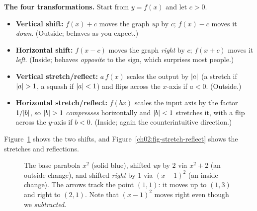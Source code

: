 \begin{focusbox}
\textbf{The four transformations.}\quad
Start from $y = f(x)$ and let $c > 0$.
\begin{itemize}
  \item \textbf{Vertical shift:} $f(x) + c$ moves the graph \emph{up} by $c$;
        $f(x) - c$ moves it \emph{down}. (Outside; behaves as you expect.)
  \item \textbf{Horizontal shift:} $f(x - c)$ moves the graph \emph{right} by $c$;
        $f(x + c)$ moves it \emph{left}. (Inside; behaves \emph{opposite} to the
        sign, which surprises most people.)
  \item \textbf{Vertical stretch/reflect:} $a\,f(x)$ scales the output by $\lvert a\rvert$
        (a stretch if $\lvert a\rvert>1$, a squash if $\lvert a\rvert<1$) and flips across the
        $x$-axis if $a < 0$. (Outside.)
  \item \textbf{Horizontal stretch/reflect:} $f(bx)$ scales the input axis by the
        factor $1/\lvert b\rvert$, so $\lvert b\rvert>1$ \emph{compresses} horizontally and
        $\lvert b\rvert<1$ stretches it, with a flip across the $y$-axis if $b < 0$.
        (Inside; again the counterintuitive direction.)
\end{itemize}
\end{focusbox}

Figure~\ref{ch02:fig-transform} shows the two shifts, and
Figure~\ref{ch02:fig-stretch-reflect} shows the stretches and reflections.

\begin{figure}[htbp]
\centering
{}
\caption{The base parabola $x^2$ (solid blue), shifted \emph{up} by $2$ via
$x^2+2$ (an outside change), and shifted \emph{right} by $1$ via $(x-1)^2$ (an
inside change). The arrows track the point $(1,1)$: it moves up to $(1,3)$ and
right to $(2,1)$. Note that $(x-1)^2$ moves right even though we \emph{subtracted}.}
\label{ch02:fig-transform}
\end{figure}

